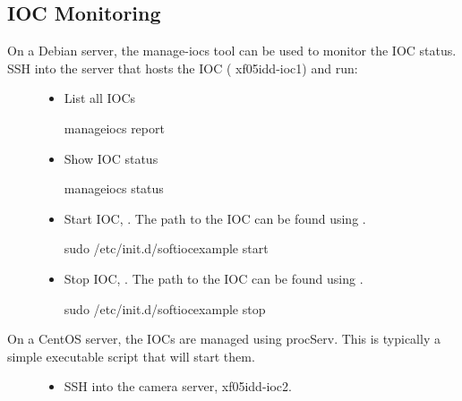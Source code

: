 \documentclass[letterpaper,10pt,english]{sphinxmanual}
\begin{document}
\subsection{IOC Monitoring}
\label{\detokenize{staff:ioc-monitoring}}\begin{description}
\item[{On a Debian server, the manage-iocs tool can be used to monitor the IOC status. SSH into the server that hosts the IOC ( xf05idd-ioc1) and run:}] \leavevmode\begin{itemize}
\item {} 
List all IOCs

\begin{sphinxVerbatim}[commandchars=\\\{\}]
\PYGZdl{} manage\PYGZhy{}iocs report
\end{sphinxVerbatim}

\item {} 
Show IOC status

\begin{sphinxVerbatim}[commandchars=\\\{\}]
\PYGZdl{} manage\PYGZhy{}iocs status
\end{sphinxVerbatim}

\item {} 
Start IOC, . The path to the IOC can be found using .

\begin{sphinxVerbatim}[commandchars=\\\{\}]
\PYGZdl{} sudo /etc/init.d/softioc\PYGZhy{}example start
\end{sphinxVerbatim}

\item {} 
Stop IOC, . The path to the IOC can be found using .

\begin{sphinxVerbatim}[commandchars=\\\{\}]
\PYGZdl{} sudo /etc/init.d/softioc\PYGZhy{}example stop
\end{sphinxVerbatim}

\end{itemize}

\item[{On a CentOS server, the IOCs are managed using procServ. This is typically a simple executable script that will start them.}] \leavevmode\begin{itemize}
\item {} 
SSH into the camera server, xf05idd-ioc2.


\end{itemize}
\end{description}
\end{document}
